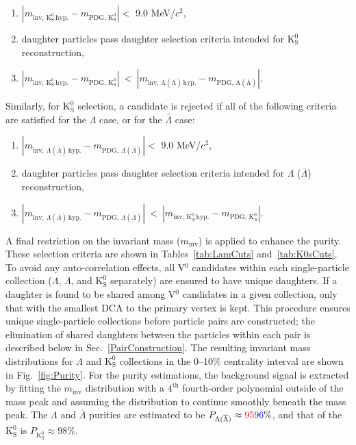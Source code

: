 \documentclass[ALICE,manyauthors]{cernphprep}
\newcommand{\minv}{$m_{\mathrm{inv}}$\xspace}
\newcommand{\Lam}{$\Lambda$\xspace}
\newcommand{\ALam}{$\overline{\Lambda}$\xspace}
\newcommand{\LamALam}{$\Lambda$ ($\overline{\Lambda}$)\xspace}
\newcommand{\Ks}{$\mathrm{K^{0}_{S}}$\xspace}
\newcommand{\Vz}{V$^{0}$\xspace}
\begin{document}
\begin{enumerate}
 \item $\left|m_{\mathrm{inv,\,K^{0}_{S}\,hyp.}} - m_{\mathrm{PDG,\,K^{0}_{S}}}\right| < $ 9.0 MeV/$c^{2}$,
 \item daughter particles pass daughter selection criteria intended for \Ks reconstruction,
 \item $\left|m_{\mathrm{inv,\,K^{0}_{S}\,hyp.}} - m_{\mathrm{PDG,\,K^{0}_{S}}}\right|~ < ~\left|m_{\mathrm{inv,\,\Lambda(\overline{\Lambda})\,hyp.}} - m_{\mathrm{PDG,\,\Lambda(\overline{\Lambda})}}\right|$.
\end{enumerate} 
Similarly, for \Ks selection, a candidate is rejected if all of the following criteria are satisfied for the \Lam case, or for the \ALam case:
\begin{enumerate}
 \item $\left|m_{\mathrm{inv},\,\Lambda(\overline{\Lambda})\,\mathrm{hyp.}} - m_{\mathrm{PDG},\,\Lambda(\overline{\Lambda})}\right| < $ 9.0 MeV/$c^{2}$,
 \item daughter particles pass daughter selection criteria intended for \LamALam reconstruction,
 \item $\left|m_{\mathrm{inv},\,\Lambda(\overline{\Lambda})\,\mathrm{hyp.}} - m_{\mathrm{PDG},\,\Lambda(\overline{\Lambda})}\right|~ < ~\left|m_{\mathrm{inv},\,\mathrm{K}^{0}_{S}\,\mathrm{hyp.}} - m_{\mathrm{PDG},\,\mathrm{K}^{0}_{S}}\right|$.
\end{enumerate} 

A final restriction on the invariant mass (\minv) is applied to enhance the purity.
These selection criteria are shown in Tables~\ref{tab:LamCuts} and~\ref{tab:K0sCuts}.
To avoid any auto-correlation effects, all \Vz candidates within each single-particle collection (\Lam, \ALam, and \Ks separately) are ensured to have unique daughters. 
If a daughter is found to be shared among \Vz candidates in a given collection, only that with the smallest DCA to the primary vertex is kept.
This procedure ensures unique single-particle collections before particle pairs are constructed; the elimination of shared daughters between the particles within each pair is described below in Sec.~\ref{PairConstruction}.
The resulting invariant mass distributions for \Lam and \Ks collections in the 0--10\% centrality interval are shown in Fig.~\ref{fig:Purity}.
For the purity estimations, the background signal is extracted by fitting the \minv distribution with a {\color{red}$4^{\mathrm{th}}$} {\color{blue}fourth}-order polynomial outside of the mass peak and assuming the distribution to continue smoothly beneath the mass peak.
The \Lam and \ALam purities are estimated to be $P_{\Lambda(\overline{\Lambda})} \approx {\color{red}95} {\color{blue}96}\%$, and that of the \Ks is $P_{\mathrm{K^{0}_{S}}} \approx 98\%$.
\end{document}

